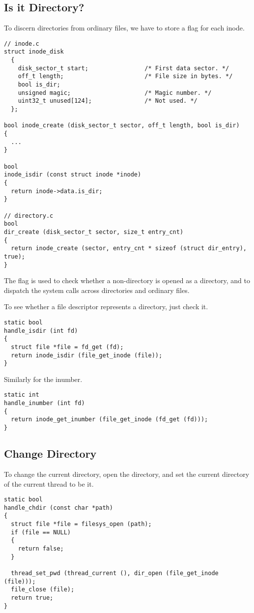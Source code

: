 \documentclass[a4paper,article,11pt,oneside]{article}
\begin{document}
\subsection{Is it Directory?}
To discern directories from ordinary files, we have to store a flag
for each inode.
\begin{verbatim}
// inode.c
struct inode_disk
  {
    disk_sector_t start;                /* First data sector. */
    off_t length;                       /* File size in bytes. */
    bool is_dir;
    unsigned magic;                     /* Magic number. */
    uint32_t unused[124];               /* Not used. */
  };

bool inode_create (disk_sector_t sector, off_t length, bool is_dir)
{
  ...
}

bool
inode_isdir (const struct inode *inode)
{
  return inode->data.is_dir;
}

// directory.c
bool
dir_create (disk_sector_t sector, size_t entry_cnt) 
{
  return inode_create (sector, entry_cnt * sizeof (struct dir_entry), true);
}
\end{verbatim}

The flag is used to check whether a non-directory is opened as a
directory, and to dispatch the system calls across directories and
ordinary files.

To see whether a file descriptor represents a directory, just check
it.
\begin{verbatim}
static bool
handle_isdir (int fd)
{
  struct file *file = fd_get (fd);
  return inode_isdir (file_get_inode (file));
}
\end{verbatim}

Similarly for the inumber.
\begin{verbatim}
static int
handle_inumber (int fd)
{
  return inode_get_inumber (file_get_inode (fd_get (fd)));
}
\end{verbatim}

\subsection{Change Directory}
To change the current directory, open the directory, and set the
current directory of the current thread to be it.
\begin{verbatim}
static bool
handle_chdir (const char *path)
{
  struct file *file = filesys_open (path);
  if (file == NULL)
  {
    return false;
  }

  thread_set_pwd (thread_current (), dir_open (file_get_inode (file)));
  file_close (file);
  return true;
}
\end{verbatim}
\end{document}
